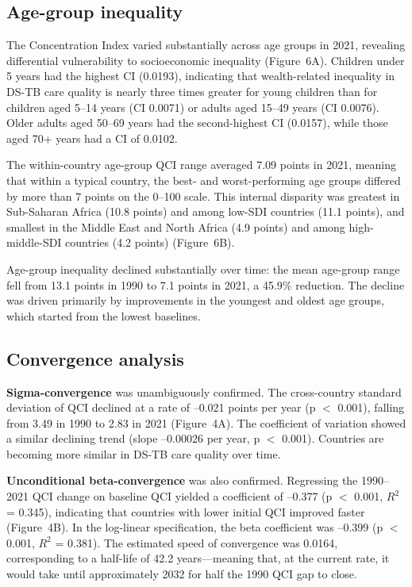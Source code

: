 \documentclass[12pt]{article}
\begin{document}
\subsection{Age-group inequality}

The Concentration Index varied substantially across age groups in 2021, revealing differential vulnerability to socioeconomic inequality (Figure~6A). Children under 5 years had the highest CI (0.0193), indicating that wealth-related inequality in DS-TB care quality is nearly three times greater for young children than for children aged 5--14 years (CI 0.0071) or adults aged 15--49 years (CI 0.0076). Older adults aged 50--69 years had the second-highest CI (0.0157), while those aged 70+ years had a CI of 0.0102.

The within-country age-group QCI range averaged 7.09 points in 2021, meaning that within a typical country, the best- and worst-performing age groups differed by more than 7 points on the 0--100 scale. This internal disparity was greatest in Sub-Saharan Africa (10.8 points) and among low-SDI countries (11.1 points), and smallest in the Middle East and North Africa (4.9 points) and among high-middle-SDI countries (4.2 points) (Figure~6B).

Age-group inequality declined substantially over time: the mean age-group range fell from 13.1 points in 1990 to 7.1 points in 2021, a 45.9\% reduction. The decline was driven primarily by improvements in the youngest and oldest age groups, which started from the lowest baselines.

\subsection{Convergence analysis}

\textbf{Sigma-convergence} was unambiguously confirmed. The cross-country standard deviation of QCI declined at a rate of --0.021 points per year (p $<$ 0.001), falling from 3.49 in 1990 to 2.83 in 2021 (Figure~4A). The coefficient of variation showed a similar declining trend (slope --0.00026 per year, p $<$ 0.001). Countries are becoming more similar in DS-TB care quality over time.

\textbf{Unconditional beta-convergence} was also confirmed. Regressing the 1990--2021 QCI change on baseline QCI yielded a coefficient of --0.377 (p $<$ 0.001, $R^2$ = 0.345), indicating that countries with lower initial QCI improved faster (Figure~4B). In the log-linear specification, the beta coefficient was --0.399 (p $<$ 0.001, $R^2$ = 0.381). The estimated speed of convergence was 0.0164, corresponding to a half-life of 42.2 years---meaning that, at the current rate, it would take until approximately 2032 for half the 1990 QCI gap to close.
\end{document}
